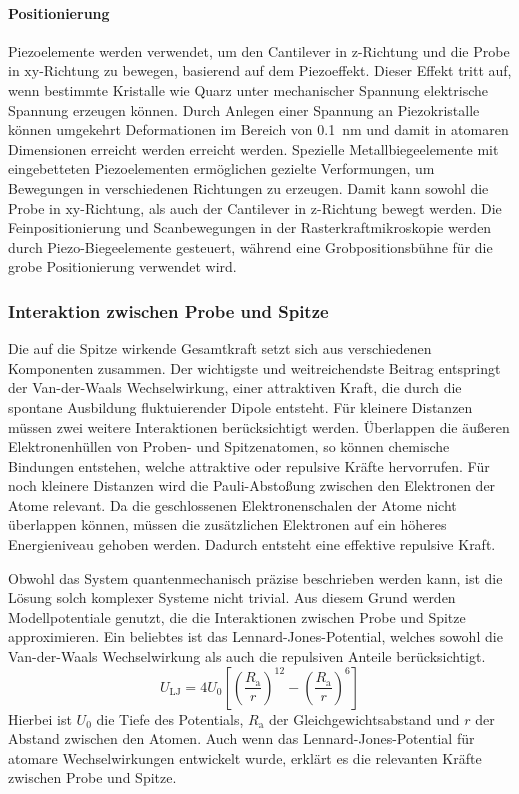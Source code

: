 \paragraph{Positionierung}
Piezoelemente werden verwendet, um den Cantilever in $\mathrm{z}$-Richtung und die Probe in $\mathrm{xy}$-Richtung zu
bewegen, basierend auf dem Piezoeffekt.
Dieser Effekt tritt auf, wenn bestimmte Kristalle wie Quarz unter mechanischer Spannung elektrische Spannung erzeugen
können.
Durch Anlegen einer Spannung an Piezokristalle können umgekehrt Deformationen im Bereich von \qty{0.1}{\nano\meter}
und damit in atomaren Dimensionen erreicht werden erreicht werden.
Spezielle Metallbiegeelemente mit eingebetteten Piezoelementen ermöglichen gezielte Verformungen, um Bewegungen
in verschiedenen Richtungen zu erzeugen.
Damit kann sowohl die Probe in $\mathrm{xy}$-Richtung, als auch der Cantilever in $\mathrm{z}$-Richtung bewegt werden.
Die Feinpositionierung und Scanbewegungen in der Rasterkraftmikroskopie werden durch Piezo-Biegeelemente gesteuert,
während eine Grobpositionsbühne für die grobe Positionierung verwendet wird.

\subsubsection{Interaktion zwischen Probe und Spitze}
Die auf die Spitze wirkende Gesamtkraft setzt sich aus verschiedenen Komponenten zusammen.
Der wichtigste und weitreichendste Beitrag entspringt der Van-der-Waals Wechselwirkung, einer attraktiven Kraft,
die durch die spontane Ausbildung fluktuierender Dipole entsteht.
Für kleinere Distanzen müssen zwei weitere Interaktionen berücksichtigt werden.
Überlappen die äußeren Elektronenhüllen von Proben- und Spitzenatomen, so können chemische Bindungen entstehen, welche
attraktive oder repulsive Kräfte hervorrufen.
Für noch kleinere Distanzen wird die Pauli-Abstoßung zwischen den Elektronen der Atome relevant.
Da die geschlossenen Elektronenschalen der Atome nicht überlappen können, müssen die zusätzlichen Elektronen auf ein
höheres Energieniveau gehoben werden.
Dadurch entsteht eine effektive repulsive Kraft.

Obwohl das System quantenmechanisch präzise beschrieben werden kann, ist die Lösung solch komplexer Systeme
nicht trivial.
Aus diesem Grund werden Modellpotentiale genutzt, die die Interaktionen zwischen Probe und Spitze approximieren.
Ein beliebtes ist das Lennard-Jones-Potential, welches sowohl die Van-der-Waals Wechselwirkung als auch die repulsiven
Anteile berücksichtigt.
\begin{equation*}
    U_{\mathrm{LJ}}=4U_{0}\left[ \left( \frac{R_{\mathrm{a}}}{r} \right)^{12} -\left( \frac{R_{\mathrm{a}}}{r}
    \right)^{6}\right]
\end{equation*}
Hierbei ist $U_{0}$ die Tiefe des Potentials, $R_{\mathrm{a}}$ der Gleichgewichtsabstand und $r$ der Abstand zwischen
den Atomen.
Auch wenn das Lennard-Jones-Potential für atomare Wechselwirkungen entwickelt wurde, erklärt es die relevanten
Kräfte zwischen Probe und Spitze. \autocite{afm-buch}

